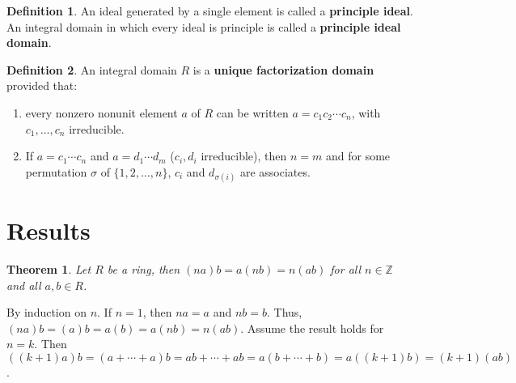 \documentclass{article}
\makeatletter
\newtheorem{theorem}{Theorem}[section]
\theoremstyle{definition}
\newtheorem{definition}{Definition}[section]
\theoremstyle{remark}
\let\oldproofname=\proofname
\renewcommand{\proofname}{\bf{\textit{\oldproofname}}}
\theoremstyle{definition}
\renewenvironment{proof}[1][\proofname]{\par
  \pushQED{\qed}%
  \normalfont \topsep6\p@\@plus6\p@\relax
  \list{}{\leftmargin=0mm
          \rightmargin=0mm
          \settowidth{\itemindent}{\itshape#1}%
          \labelwidth=4mm
          \parsep=0pt \listparindent=0mm%
  }
  \item[\hskip\labelsep
        \itshape
    #1\@addpunct{.}]\ignorespaces
}{%
  \popQED\endlist\@endpefalse
}
\makeatother
\begin{document}
    \begin{definition}\label{df:1.21}
        An ideal generated by a single element is called a \textbf{principle ideal}. An integral domain in which every ideal is principle is called a \textbf{principle ideal domain}.
    \end{definition}
    
    \begin{definition}\label{df:1.22}
        An integral domain $R$ is a \textbf{unique factorization domain} provided that:
            \begin{enumerate}[label=(\roman*)]
                \item every nonzero nonunit element $a$ of $R$ can be written $a=c_1c_2\cdots c_n$, with $c_1,\dots,c_n$ irreducible.
                \item If $a=c_1\cdots c_n$ and $a=d_1\cdots d_m$ ($c_i,d_i$ irreducible), then $n=m$ and for some permutation $\sigma$ of $\{1,2,\dots,n\}$, $c_i$ and $d_{\sigma(i)}$ are associates.
            \end{enumerate}
    \end{definition}\newpage

\section{Results}
    \begin{theorem}\label{thm:2.1}
        Let $R$ be a ring, then $(na)b=a(nb)=n(ab)$ for all $n\in\mathbb{Z}$ and all $a,b\in R$.
    \end{theorem}
        \begin{proof}
            By induction on $n$. If $n=1$, then $na=a$ and $nb=b$. Thus, $(na)b=(a)b=a(b)=a(nb)=n(ab)$. Assume the result holds for $n=k$. Then $((k+1)a)b=(a+\cdots+a)b=ab+\cdots+ab=a(b+\cdots+b)=a((k+1)b)=(k+1)(ab)$.
        \end{proof}
\end{document}
